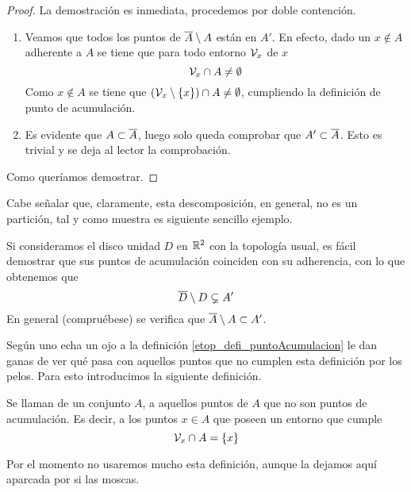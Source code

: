 \begin{proof}
	La demostración es inmediata, procedemos por doble contención.
	\begin{enumerate}
		\item[\bsubset] Veamos que todos los puntos de $\overline{A}\setminus A$ están en $A'$. En efecto, dado un $x\not\in A$ adherente a $A$ se tiene que para todo entorno $\mathcal{V}_x$ de $x$
		\begin{equation*}
			\mathcal{V}_x\cap A\not=\emptyset
		\end{equation*}
		Como $x\not\in A$ se tiene que $(\mathcal{V}_x\setminus\{x\})\cap A\not=\emptyset$, cumpliendo la definición de punto de acumulación.
		\item[\bsupset] Es evidente que $A\subset\overline{A}$, luego solo queda comprobar que $A'\subset \overline{A}$. Esto es trivial y se deja al lector la comprobación.
	\end{enumerate}
	Como queríamos demostrar.
\end{proof}
Cabe señalar que, claramente, esta descomposición, en general, no es un partición, tal y como muestra es siguiente sencillo ejemplo.
\begin{exa}[Disco]
	Si consideramos el disco unidad $D$ en $\mathbb{R}^2$ con la topología usual, es fácil demostrar que sus puntos de acumulación coinciden con su adherencia, con lo que obtenemos que
	\begin{equation}
		\overline{D}\setminus D \subsetneq A'
	\end{equation}
	En general (compruébese) se verifica que $\overline{A}\setminus A\subset A'$.
\end{exa}
Según uno echa un ojo a la definición \ref{etop_defi_puntoAcumulacion} le dan ganas de ver qué pasa con aquellos puntos que no cumplen esta definición por los pelos. Para esto introducimos la siguiente definición.
\begin{defi}
	Se llaman  de un conjunto $A$, a aquellos puntos de $A$ que no son puntos de acumulación. Es decir, a los puntos $x\in A$ que poseen un entorno que cumple
	\begin{equation*}
		\mathcal{V}_x\cap A = \{x\}
	\end{equation*}
\end{defi}
Por el momento no usaremos mucho esta definición, aunque la dejamos aquí aparcada por si las moscas.

